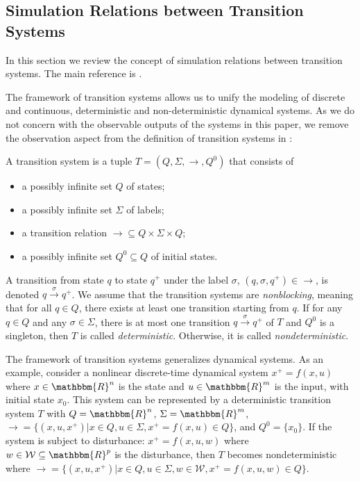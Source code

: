 \subsection{Simulation Relations between Transition
Systems}\label{sec:abstraction:simulation}

In this section we review the concept of simulation relations between
transition systems. The main reference is {\cite{girardetal07amd}}.

The framework of transition systems allows us to unify the modeling of
discrete and continuous, deterministic and non-deterministic dynamical
systems. As we do not concern with the observable outputs of the systems in
this paper, we remove the observation aspect from the definition of transition
systems in {\cite{girardetal07amd}}:

\begin{definition}
  \label{thm:transition-systems-def}
  A transition system is a tuple $T = (Q, \Sigma, \rightarrow, Q^0)$ that
  consists of
  \begin{itemize}
  \item a possibly infinite set $Q$ of states;
  \item a possibly infinite set $\Sigma$ of labels;
  \item a transition relation $\rightarrow \subseteq Q \times \Sigma \times
    Q$;
  \item a possibly infinite set $Q^0 \subseteq Q$ of initial states.
  \end{itemize}
\end{definition}

A transition from state $q$ to state $q^+$ under the label $\sigma$, {\ie}
$(q, \sigma, q^+) \in \rightarrow$, is denoted $q \xrightarrow{\sigma} q^+$.
We assume that the transition systems are {\emph{nonblocking}}, meaning that
for all $q \in Q$, there exists at least one transition starting from $q$. If
for any $q \in Q$ and any $\sigma \in \Sigma$, there is at most one transition
$q \xrightarrow{\sigma} q^+$ of $T$ and $Q^0$ is a singleton, then $T$ is
called {\emph{deterministic}}. Otherwise, it is called
{\emph{nondeterministic}}.

\begin{example}
  The framework of transition systems generalizes dynamical systems. As an
  example, consider a nonlinear discrete-time dynamical system $x^+ = f (x,
  u)$ where $x \in \mathbbm{R}^n$ is the state and $u \in \mathbbm{R}^m$ is
  the input, with initial state $x_{0}$.
  This system can be represented by a deterministic transition
  system $T$ with $Q =\mathbbm{R}^n$, $\Sigma =\mathbbm{R}^m$,
  $\rightarrow = \{ (x, u, x^+) |x \in Q, u \in \Sigma, x^+ = f (x, u) \in Q
  \}$, and $Q^{0} = \{x_{0}\}$.
  If the system is subject to disturbance: $x^+ = f (x, u, w)$ where
  $w \in \mathcal{W} \subseteq \mathbbm{R}^p$ is the disturbance, then $T$
  becomes nondeterministic where $\rightarrow = \{ (x, u, x^+) |x \in Q, u \in
  \Sigma, w \in \mathcal{W}, x^+ = f (x, u, w) \in Q \}$.
\end{example}

